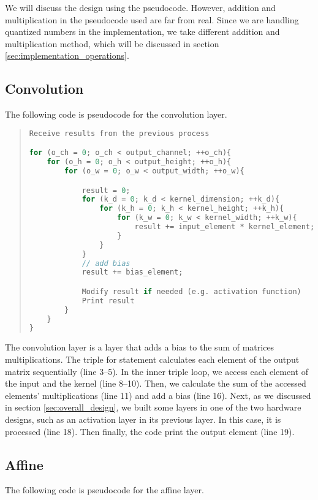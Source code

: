 We will discuss the design using the pseudocode. However, addition and multiplication in the pseudocode used are far from real. Since we are handling quantized numbers in the implementation, we take different addition and multiplication method, which will be discussed in section \ref{sec:implementation_operations}.

\subsection{Convolution}
The following code is pseudocode for the convolution layer.

\begin{quote}
\begin{lstlisting}[language=C, frame=l]
Receive results from the previous process

for (o_ch = 0; o_ch < output_channel; ++o_ch){
    for (o_h = 0; o_h < output_height; ++o_h){
        for (o_w = 0; o_w < output_width; ++o_w){

            result = 0;
            for (k_d = 0; k_d < kernel_dimension; ++k_d){
                for (k_h = 0; k_h < kernel_height; ++k_h){
                    for (k_w = 0; k_w < kernel_width; ++k_w){
                        result += input_element * kernel_element;
                    }
                }
            }
            // add bias
            result += bias_element;

            Modify result if needed (e.g. activation function)
            Print result
        }
    }
}
\end{lstlisting}


\end{quote}

The convolution layer is a layer that adds a bias to the sum of matrices multiplications. The triple for statement calculates each element of the output matrix sequentially  (line 3--5). In the inner triple loop, we access each element of the input and the kernel (line 8--10). Then, we calculate the sum of the accessed elements' multiplications (line 11) and add a bias (line 16). Next, as we discussed in section \ref{sec:overall_design}, we built some layers in one of the two hardware designs, such as an activation layer in its previous layer. In this case, it is processed (line 18). Then finally, the code print the output element (line 19).


\subsection{Affine}
The following code is pseudocode for the affine layer.


